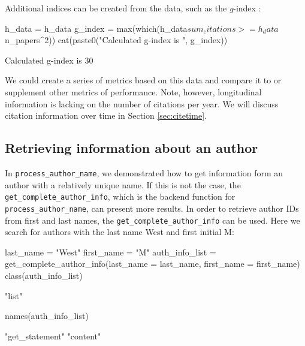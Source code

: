 Additional indices can be created from the data, such as the
\emph{g}-index \citep{egghe2006theory}:

\begin{Schunk}
\begin{Sinput}
h_data = h_data %
g_index = max(which(h_data$sum_citations >= h_data$n_papers^2))
cat(paste0("Calculated g-index is ", g_index))
\end{Sinput}
\begin{Soutput}
Calculated g-index is 30
\end{Soutput}
\end{Schunk}

We could create a series of metrics based on this data and compare it to
or supplement other metrics of performance. Note, however, longitudinal
information is lacking on the number of citations per year. We will
discuss citation information over time in Section \ref{sec:citetime}.

\hypertarget{retrieving-information-about-an-author}{%
\subsection{Retrieving information about an
author}\label{retrieving-information-about-an-author}}

In \texttt{process\_author\_name}, we demonstrated how to get
information form an author with a relatively unique name. If this is not
the case, the \texttt{get\_complete\_author\_info}, which is the backend
function for \texttt{process\_author\_name}, can present more results.
In order to retrieve author IDs from first and last names, the
\texttt{get\_complete\_author\_info} can be used. Here we search for
authors with the last name West and first initial M:

\begin{Schunk}
\begin{Sinput}
last_name = "West"
first_name = "M"
auth_info_list = get_complete_author_info(last_name = last_name, first_name = first_name)
class(auth_info_list)
\end{Sinput}
\begin{Soutput}
[1] "list"
\end{Soutput}
\begin{Sinput}
names(auth_info_list)
\end{Sinput}
\begin{Soutput}
[1] "get_statement" "content"      
\end{Soutput}
\end{Schunk}


